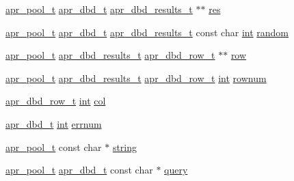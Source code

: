 \begin{DoxyCompactItemize}
\item 
\hyperlink{structapr__pool__t}{apr\+\_\+pool\+\_\+t} \hyperlink{group__APR__Util__DBD_ga4738c1f6340184987fc7806522c18ab8}{apr\+\_\+dbd\+\_\+t} \hyperlink{group__APR__Util__DBD_ga6765891011818912e1b52fef773bfce6}{apr\+\_\+dbd\+\_\+results\+\_\+t} $\ast$$\ast$ \hyperlink{group__APR__Util__DBD_ga3bb17d78322a086f98b82abd8bb9a8cd}{res}
\item 
\hyperlink{structapr__pool__t}{apr\+\_\+pool\+\_\+t} \hyperlink{group__APR__Util__DBD_ga4738c1f6340184987fc7806522c18ab8}{apr\+\_\+dbd\+\_\+t} \hyperlink{group__APR__Util__DBD_ga6765891011818912e1b52fef773bfce6}{apr\+\_\+dbd\+\_\+results\+\_\+t} const char \hyperlink{pcre_8txt_a42dfa4ff673c82d8efe7144098fbc198}{int} \hyperlink{group__APR__Util__DBD_gac93942ec5efab7a3d75b75e70c8c7a94}{random}
\item 
\hyperlink{structapr__pool__t}{apr\+\_\+pool\+\_\+t} \hyperlink{group__APR__Util__DBD_ga6765891011818912e1b52fef773bfce6}{apr\+\_\+dbd\+\_\+results\+\_\+t} \hyperlink{group__APR__Util__DBD_gab890e4650a1de51725142318825103a5}{apr\+\_\+dbd\+\_\+row\+\_\+t} $\ast$$\ast$ \hyperlink{group__APR__Util__DBD_ga98834f9ea71a411bba8858886c6454ed}{row}
\item 
\hyperlink{structapr__pool__t}{apr\+\_\+pool\+\_\+t} \hyperlink{group__APR__Util__DBD_ga6765891011818912e1b52fef773bfce6}{apr\+\_\+dbd\+\_\+results\+\_\+t} \hyperlink{group__APR__Util__DBD_gab890e4650a1de51725142318825103a5}{apr\+\_\+dbd\+\_\+row\+\_\+t} \hyperlink{pcre_8txt_a42dfa4ff673c82d8efe7144098fbc198}{int} \hyperlink{group__APR__Util__DBD_ga75c9df9c4ef67392d3f04dd674382bce}{rownum}
\item 
\hyperlink{group__APR__Util__DBD_gab890e4650a1de51725142318825103a5}{apr\+\_\+dbd\+\_\+row\+\_\+t} \hyperlink{pcre_8txt_a42dfa4ff673c82d8efe7144098fbc198}{int} \hyperlink{group__APR__Util__DBD_gae2d80c10d5136f660b76beaf704934f5}{col}
\item 
\hyperlink{group__APR__Util__DBD_ga4738c1f6340184987fc7806522c18ab8}{apr\+\_\+dbd\+\_\+t} \hyperlink{pcre_8txt_a42dfa4ff673c82d8efe7144098fbc198}{int} \hyperlink{group__APR__Util__DBD_ga705b7ca7fb0a9700b61ad996d694a778}{errnum}
\item 
\hyperlink{structapr__pool__t}{apr\+\_\+pool\+\_\+t} const char $\ast$ \hyperlink{group__APR__Util__DBD_ga7793f069712367d96ac8021492fba941}{string}
\item 
\hyperlink{structapr__pool__t}{apr\+\_\+pool\+\_\+t} \hyperlink{group__APR__Util__DBD_ga4738c1f6340184987fc7806522c18ab8}{apr\+\_\+dbd\+\_\+t} const char $\ast$ \hyperlink{group__APR__Util__DBD_ga1086b66aba6ed16e6853a4cef784f8f6}{query}

\end{DoxyCompactItemize}
